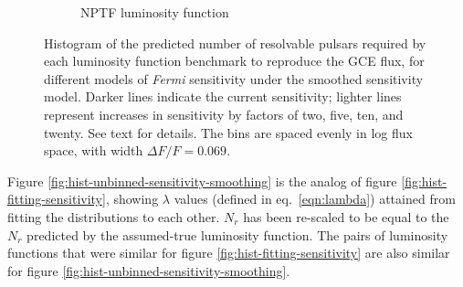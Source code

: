 \documentclass[letter,11pt]{article}
\begin{document}
\begin{figure}
\begin{subfigure}[b]{0.49\textwidth}
        \caption{NPTF luminosity function}
    \end{subfigure}
    \caption{Histogram of the predicted number of resolvable pulsars required by each luminosity function benchmark to reproduce the GCE flux, for different models of \textit{Fermi} sensitivity under the smoothed sensitivity model. Darker lines indicate the current sensitivity; lighter lines represent increases in sensitivity by factors of two, five, ten, and twenty. See text for details. The bins are spaced evenly in log flux space, with width $\Delta F / F = 0.069$.}
    \label{fig:sensitivity-results-smoothing}
\end{figure}

Figure \ref{fig:hist-unbinned-sensitivity-smoothing} is the analog of figure \ref{fig:hist-fitting-sensitivity}, showing $\lambda$ values (defined in eq.~\ref{eqn:lambda}) attained from fitting the distributions to each other. $N_r$ has been re-scaled to be equal to the $N_r$ predicted by the assumed-true luminosity function. The pairs of luminosity functions that were similar for figure \ref{fig:hist-fitting-sensitivity} are also similar for figure \ref{fig:hist-unbinned-sensitivity-smoothing}.
\end{document}
